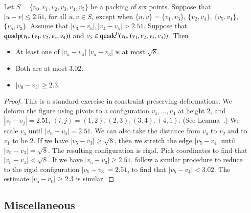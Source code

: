 \begin{tarskidata}
\begin{tarski}
\begin{lemma}
Let $S=\{v_0,v_1,v_2,v_3,v_4,v_5\}$ be a packing of six points.  
Suppose that $|u-v|\le 2.51$, for all $u,v\in S$, 
except
when $\{u,v\}=\{v_1,v_3\}$, $\{v_2,v_4\}$, $\{v_5,v_4\}$,
$\{v_5,v_3\}$.  
Assume that $|v_3-v_5|,|v_4-v_5|>2.51$.
Suppose that ${\operatorname{quadp}}(v_0,(v_1,v_2,v_3,v_4))$
and $v_5\in{\operatorname{quadc}}^0(v_0,(v_1,v_2,v_3,v_4))$.
Then
\begin{itemize}
  \item At least one of $|v_5-v_4|$ $|v_5-v_3|$ is at most $\sqrt8$.
    \item Both are at most $3.02$.
  \item $|v_0-v_5|\ge 2.3$.
\end{itemize}
\end{lemma}

\begin{proof}
This is a standard exercise in constraint preserving deformations.
We deform the figure using pivots to a configuration
$v_1,\ldots,v_4$ at height $2$, and $|v_i-v_j|=2.51$,
$(i,j)=(1,2),(2,3),(3,4),(4,1)$. (See Lemma~.)
We scale $v_5$ until $|v_5-v_0|=2.51
$. We can also take the distance from $v_5$ to $v_2$ and to $v_1$
to be $2$. If we have $|v_5-v_3|\ge \sqrt{8}$, then we stretch
the edge $|v_5-v_4|$ until $|v_5-v_3|=\sqrt{8}$. The resulting
configuration is rigid.  Pick coordinates to find that
$|v_5-v_4|<\sqrt{8}$. If we have $|v_5-v_3|\ge 2.51 $, follow a
similar procedure to reduce to the rigid configuration
$|v_5-v_3|=2.51$, to find that $|v_5-v_4|<3.02$. The estimate
$|v_5-v_0|\ge2.3$ is similar.
\end{proof}
\end{tarski}












\begin{tarski}
\section{Miscellaneous}



\end{tarski}
\end{tarskidata}
